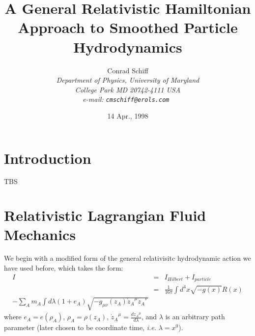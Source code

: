 %
%



\title{A General Relativistic Hamiltonian Approach to Smoothed Particle Hydrodynamics}
%
\author{   \sc
            Conrad Schiff\\
           \em
            Department of Physics, University of Maryland%
           \\ \em
            College Park MD 20742-4111 USA\\
           \rm
         e-mail: \tt cmschiff@erols.com
        }
\date{14 Apr., 1998}
%
\maketitle

\section{Introduction}

TBS

\section{Relativistic Lagrangian Fluid Mechanics}\label{sec:starting_action}
We begin with a modified form of the general relativisitc hydrodynamic action we have used before,
which takes the form:
\begin{eqnarray}\label{eq:start_I}
I & = & I_{Hilbert} + I_{particle} \nonumber \\
  & = & \frac{1}{16 \pi} \int \! d^4x \sqrt{-g(x)} R(x) \nonumber \\
       - \sum_{A} m_A \int \! d\lambda ( 1 + e_A ) \sqrt{ -g_{\mu\nu}(z_A) {\dot z_A}^{\mu} {\dot z_A}^{\nu} }
\end{eqnarray}
where $e_A = e(\rho_A)$, $\rho_A = \rho(z_A)$, ${\dot z_A}^{\mu} = \frac{d {z_A}^{\mu}}{d\lambda}$,
and $\lambda$ is an arbitrary path parameter (later chosen to be coordinate time, {\it i.e.}
$\lambda = x^{0}$).

